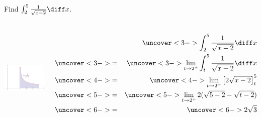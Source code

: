 \begin{frame}
\begin{example}[Example 5, p. 548]
Find $\int_2^5 \frac{1}{\sqrt{x-2}}\diff x$.

\begin{columns}[c]
\ \includegraphics[height=4cm]{improper-integrals/pictures/08-08-ex5.pdf}%

\begin{eqnarray*}
& & %
\uncover<3->{%
\int_2^5 \frac{1}{\sqrt{x-2}}\diff x%
}\\%
& \uncover<3->{ = } &%
\uncover<3->{%
\lim_{t\rightarrow 2^+}\int_t^5 \frac{1}{\sqrt{x-2}}\diff x%
}\\%
& \uncover<4->{ = } &%
\uncover<4->{%
\lim_{t\rightarrow 2^+}\left[ 2\sqrt{x-2}\right]_t^5%
}\\%
& \uncover<5->{ = } &%
\uncover<5->{%
\lim_{t\rightarrow 2^+} 2(\sqrt{5-2} - \sqrt{t-2})%
}\\%
& \uncover<6->{ = } &%
\uncover<6->{%
2\sqrt{3}%
}\\%
\end{eqnarray*}
\end{columns}
\end{example}
\end{frame}
